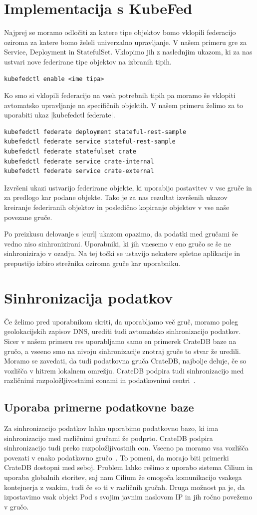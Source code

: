 \documentclass[a4paper, 12pt]{book}
\begin{document}
\section{Implementacija s KubeFed}
Najprej se moramo odločiti za katere tipe objektov bomo vklopili federacijo oziroma za katere bomo želeli univerzalno upravljanje.
V našem primeru gre za Service, Deployment in StatefulSet.
Vklopimo jih z naslednjim ukazom, ki za nas ustvari nove federirane tipe objektov na izbranih tipih.
\begin{verbatim}
kubefedctl enable <ime tipa>
\end{verbatim}
Ko smo si vklopili federacijo na vseh potrebnih tipih pa moramo še vklopiti avtomatsko upravljanje na specifičnih objektih.
V našem primeru želimo za to uporabiti ukaz \spverb|kubefedctl federate|.
\begin{verbatim}
kubefedctl federate deployment stateful-rest-sample
kubefedctl federate service stateful-rest-sample
kubefedctl federate statefulset crate
kubefedctl federate service crate-internal
kubefedctl federate service crate-external
\end{verbatim}
Izvršeni ukazi ustvarijo federirane objekte, ki uporabijo postavitev v vse gruče in za predlogo kar podane objekte.
Tako je za nas rezultat izvršenih ukazov kreiranje federiranih objektov in posledično kopiranje objektov v vse naše povezane gruče.

Po preizkusu delovanje s \spverb|curl| ukazom opazimo, da podatki med gručami še vedno niso sinhronizirani.
Uporabniki, ki jih vnesemo v eno gručo se še ne sinhronizirajo v ozadju.
Na tej točki se ustavijo nekatere spletne aplikacije in prepustijo izbiro strežnika oziroma gruče kar uporabniku.
\section{Sinhronizacija podatkov}
Če želimo pred uporabnikom skriti, da uporabljamo več gruč, moramo poleg geolokacijskih zapisov DNS, urediti tudi avtomatsko sinhronizacijo podatkov.
Sicer v našem primeru res uporabljamo samo en primerek CrateDB baze na gručo, a vseeno smo na nivoju sinhronizacije znotraj gruče to stvar že uredili. 
Moramo se zavedati, da tudi podatkovna gruča CrateDB, najbolje deluje, če so vozlišča v hitrem lokalnem omrežju.
CrateDB podpira tudi sinhronizacijo med različnimi razpoložljivostnimi conami in podatkovnimi centri~\cite{cratedb-zone}.
\subsection{Uporaba primerne podatkovne baze}
Za sinhronizacijo podatkov lahko uporabimo podatkovno bazo, ki ima sinhronizacijo med različnimi gručami že podprto.
CrateDB podpira sinhronizacijo tudi preko razpoložljivostnih con.
Vseeno pa moramo vsa vozlišča povezati v enako podatkovno gručo~\cite{cratedb-zone}.
To pomeni, da morajo biti primerki CrateDB dostopni med seboj.
Problem lahko rešimo z uporabo sistema Cilium in uporaba globalnih storitev, saj nam Cilium že omogoča komunikacijo vsakega kontejnerja z vsakim, tudi če so ti v različnih gručah.
Druga možnost pa je, da izpostavimo vsak objekt Pod s svojim javnim naslovom IP in jih ročno povežemo v gručo.
\end{document}
